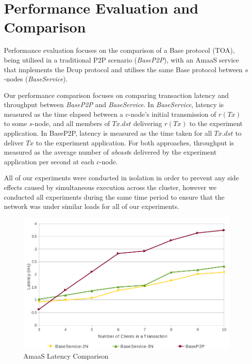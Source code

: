 \section{Performance Evaluation and Comparison}\label{sec:AmaaS_results}
Performance evaluation focuses on the comparison of a \textsf{Base} protocol (TOA), being utilised in a traditional P2P scenario (\emph{BaseP2P}), with an \textsf{AmaaS} service that implements the \textsf{Dcup} protocol and utilises the same \textsf{Base} protocol between $s$-nodes (\emph{BaseService}).

Our performance comparison focuses on comparing transaction latency and throughput between \emph{BaseP2P} and \emph{BaseService}.  In \emph{BaseService}, latency is measured as the time elapsed between a $c$-node's initial transmission of $r(Tx)$ to some $s$-node, and all members of $Tx.dst$ delivering $r(Tx)$ to the experiment application. In BaseP2P, latency is measured as the time taken for all $Tx.dst$ to deliver $Tx$ to the experiment application. For both approaches, throughput is measured as the average number of \emph{abcast}s delivered by the experiment application per second at each $c$-node.

All of our experiments were conducted in isolation in order to prevent any side effects caused by simultaneous execution across the cluster, however we conducted all experiments during the same time period to ensure that the network was under similar loads for all of our experiments. 

\begin{figure}[htbp!]
 \includegraphics[width=\textwidth,height=\textheight,keepaspectratio]{Latency}
 \caption{AmaaS Latency Comparison}
 \label{fig:LatencyGraph}
\end{figure}

